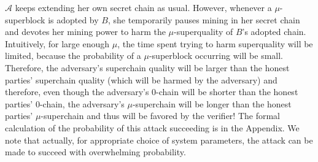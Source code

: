 $\mathcal{A}$ keeps extending her own secret chain as usual. However, whenever a
$\mu$-superblock is adopted by $B$, she temporarily pauses mining in her secret
chain and devotes her mining power to harm the $\mu$-superquality of $B$'s
adopted chain. Intuitively, for large enough $\mu$, the time spent trying to
harm superquality will be limited, because the probability of a $\mu$-superblock
occurring will be small. Therefore, the adversary's superchain quality will be
larger than the honest parties' superchain quality (which will be harmed by the
adversary) and therefore, even though the adversary's $0$-chain will be shorter
than the honest parties' $0$-chain, the adversary's $\mu$-superchain will be
longer than the honest parties' $\mu$-superchain and thus will be favored by the
verifier! The formal calculation of the
probability of this attack succeeding is in the Appendix. We note that  actually, for appropriate choice of system parameters, the attack can be made to
succeed with overwhelming probability.
